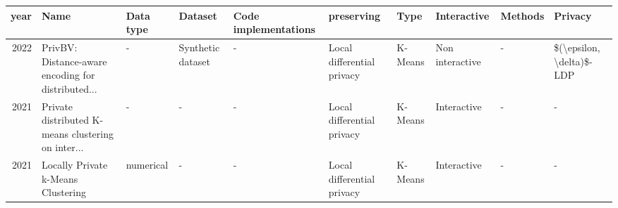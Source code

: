 \begin{landscape}
  \begin{table}[ht]
    \centering
    \begin{adjustbox}{width=1.8\textwidth}
      \begin{tabular}{rlllllllll}
        \toprule
        year                                            & Name                                                                                                          & Data type                            & Dataset                                            & Code implementations                    & preserving                 & Type                & Interactive     & Methods                                   & Privacy                                                                                                       \\
        \midrule
        2022 \citep{sun_privbv_2022}                    & PrivBV: Distance-aware encoding for distributed...                                                            & -                                    & Synthetic dataset                                  & -                                       & Local differential privacy & K-Means             & Non interactive & -                                         & \$(\textbackslash epsilon, \textbackslash delta)\$-LDP                                                        \\
        2021 \citep{9679364}                            & Private distributed K-means clustering on inter...                                                            & -                                    & -                                                  & -                                       & Local differential privacy & K-Means             & Interactive     & -                                         & -                                                                                                             \\
        2021 \citep{stemmer_locally_2021}               & Locally Private k-Means Clustering                                                                            & numerical                            & -                                                  & -                                       & Local differential privacy & K-Means             & Interactive     & -                                         & -                                                                                                             \\

\end{tabular}
\end{adjustbox}
\end{table}
\end{landscape}
